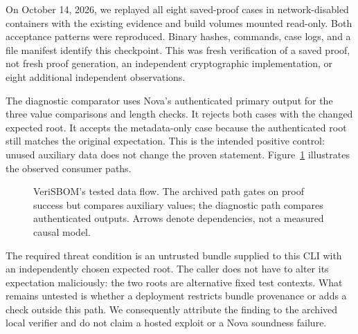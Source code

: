 \documentclass[sigconf,nonacm]{acmart}
\begin{document}
On October 14, 2026, we replayed all eight saved-proof cases in network-disabled containers with the existing evidence and build volumes mounted read-only. Both acceptance patterns were reproduced. Binary hashes, commands, case logs, and a file manifest identify this checkpoint. This was fresh verification of a saved proof, not fresh proof generation, an independent cryptographic implementation, or eight additional independent observations.

The diagnostic comparator uses Nova's authenticated primary output for the three value comparisons and length checks. It rejects both cases with the changed expected root. It accepts the metadata-only case because the authenticated root still matches the original expectation. This is the intended positive control: unused auxiliary data does not change the proven statement. Figure~\ref{fig:flow} illustrates the observed consumer paths.

\begin{figure}[t]
\centering
{}
\caption{VeriSBOM's tested data flow. The archived path gates on proof success but compares auxiliary values; the diagnostic path compares authenticated outputs. Arrows denote dependencies, not a measured causal model.}
\label{fig:flow}
\end{figure}

The required threat condition is an untrusted bundle supplied to this CLI with an independently chosen expected root. The caller does not have to alter its expectation maliciously: the two roots are alternative fixed test contexts. What remains untested is whether a deployment restricts bundle provenance or adds a check outside this path. We consequently attribute the finding to the archived local verifier and do not claim a hosted exploit or a Nova soundness failure.
\end{document}
